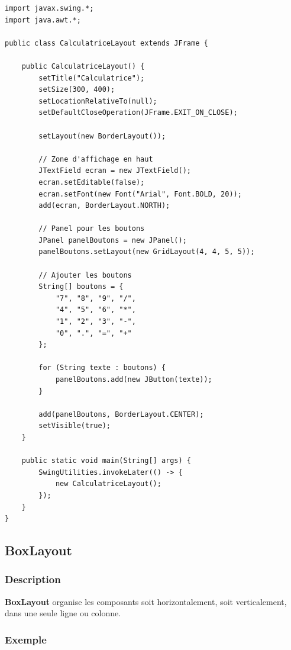 \documentclass[11pt,a4paper]{article}
\begin{document}
\begin{lstlisting}
import javax.swing.*;
import java.awt.*;

public class CalculatriceLayout extends JFrame {
    
    public CalculatriceLayout() {
        setTitle("Calculatrice");
        setSize(300, 400);
        setLocationRelativeTo(null);
        setDefaultCloseOperation(JFrame.EXIT_ON_CLOSE);
        
        setLayout(new BorderLayout());
        
        // Zone d'affichage en haut
        JTextField ecran = new JTextField();
        ecran.setEditable(false);
        ecran.setFont(new Font("Arial", Font.BOLD, 20));
        add(ecran, BorderLayout.NORTH);
        
        // Panel pour les boutons
        JPanel panelBoutons = new JPanel();
        panelBoutons.setLayout(new GridLayout(4, 4, 5, 5));
        
        // Ajouter les boutons
        String[] boutons = {
            "7", "8", "9", "/",
            "4", "5", "6", "*",
            "1", "2", "3", "-",
            "0", ".", "=", "+"
        };
        
        for (String texte : boutons) {
            panelBoutons.add(new JButton(texte));
        }
        
        add(panelBoutons, BorderLayout.CENTER);
        setVisible(true);
    }
    
    public static void main(String[] args) {
        SwingUtilities.invokeLater(() -> {
            new CalculatriceLayout();
        });
    }
}
\end{lstlisting}

\subsection{BoxLayout}

\subsubsection{Description}

\textbf{BoxLayout} organise les composants soit horizontalement, soit verticalement, dans une seule ligne ou colonne.

\subsubsection{Exemple}
\end{document}
